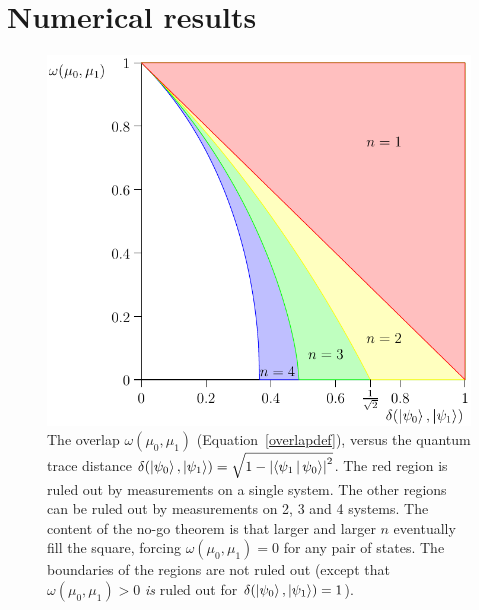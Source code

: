 \documentclass[amsmath,amssymb,superscriptaddress,pra,12pt]{revtex4-1}
\newcommand{\abs}[1]{\left\lvert{#1}\right\rvert}
\begin{document}
\section{Numerical results}

\begin{figure}
  \begin{center}
\includegraphics[scale=0.7]{figs/regions}
  \end{center}
\caption{The overlap $\omega(\mu_0,\mu_1)$ (Equation~\eqref{overlapdef}), versus the quantum trace distance $\delta(\ket{\psi_0}, \ket{\psi_1}) = \sqrt{1 - \abs{\Braket{\psi_1|\psi_0}}^2}$. The red region is ruled out by measurements on a single system. The other regions can be ruled out by measurements on 2, 3 and 4 systems. The content of the no-go theorem is that larger and larger $n$ eventually fill the square, forcing $\omega(\mu_0, \mu_1) = 0$ for any pair of states. The boundaries of the regions are not ruled out (except that $\omega(\mu_0, \mu_1)>0$ \emph{is} ruled out for $\delta(\ket{\psi_0}, \ket{\psi_1}) = 1$).}
  \label{regions}
\end{figure}
\end{document}

